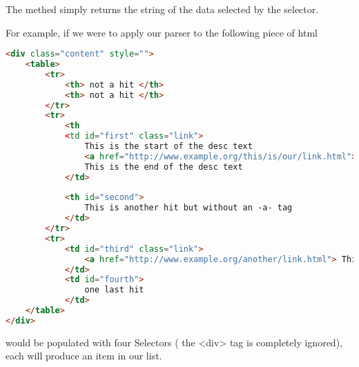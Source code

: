 The  methed simply returns the string of the data selected by the selector.

For example, if we were to apply our parser to the following piece of html

\begin{lstlisting}[language=HTML]
<div class="content" style="">
	<table>
		<tr>
			<th> not a hit </th>
			<th> not a hit </th>
		</tr>
		<tr>
			<th
			<td id="first" class="link">
				This is the start of the desc text
				<a href="http://www.example.org/this/is/our/link.html"> This is our link text</a>
				This is the end of the desc text
			</td>
		
			<th id="second">
				This is another hit but without an -a- tag
			</td>
		</tr>
		<tr>
			<td id="third" class="link">
				<a href="http://www.example.org/another/link.html"> This is our link text</a>
			</td>
			<td id="fourth">
				one last hit
			</td>
	</table>
</div>
\end{lstlisting}
 would be populated with four Selectors ( the <div> tag is completely ignored), each will produce an item in our  list. 
